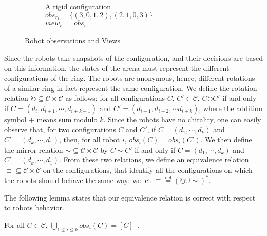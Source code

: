 \documentclass[envcountsame]{llncs} \usepackage[english]{babel}
\newcommand{\view}{\ensuremath{\mathit{view}}}
\newcommand{\obs}{\ensuremath{\mathit{obs}}}
\newcommand{\equivclass}[1]{[#1]_\equiv}
\newcommand{\Config}{\ensuremath{\mathcal{C}}}
\begin{document}
\begin{figure}[t]
\begin{subfigure}[b]{0.30\textwidth}
\caption{A rigid configuration \\${\scriptstyle obs_{r_1}=\{(3,0,1,2),(2,1,0,3)\}}$\\ ${\scriptstyle \view_{r_1} = obs_{r_1}}$}
\label{fig:views3}
  \end{subfigure}
  \caption{Robot observations and Views}
  \label{fig:views}
\end{figure}






Since the robots take snapshots of the configuration, and their decisions are based on this information,
the states of the arena must represent the different configurations of the ring.
The robots are anonymous, hence, different rotations of a similar ring in fact represent the same configuration.
We define the rotation relation $\circlearrowright \subseteq \Config\times \Config$ as follows: for all configurations $C$, $C'\in \Config$,
$C\circlearrowright C'$ if and only if $C=(d_i,d_{i+1}, \cdots, d_{i+k-1})$ and $C'=(d_{i+1}, d_{i+2}, \cdots d_{i+k})$, where the addition symbol $+$
means sum modulo $k$.
Since the robots have no chirality, one can easily observe that, for two configurations $C$ and $C'$, if $C=(d_1,\cdots, d_k)$ and
$C'=(d_k, \cdots, d_1)$, then, for all robot $i$, $\obs_i(C)=\obs_i(C')$. We then define the mirror relation $\sim\subseteq \Config\times\Config$
by $C\sim C'$ if and only if $C=(d_1,\cdots, d_k)$ and
$C'=(d_k, \cdots, d_1)$.
From these two relations, we define an equivalence relation ${\equiv}\subseteq \Config\times\Config$ on the configurations, that identify all the configurations
on which the robots should behave the same way: we let ${\equiv} \stackrel{\mathrm{def}}{=} {(\circlearrowright\cup \sim)^*}$.

The following lemma states that our equivalence relation is correct with respect to robots behavior.
\begin{lemma}\label{lem:equivalence-classes}
For all $C\in \Config$, $\bigcup_{1\leq i\leq k} \obs_i(C) = \equivclass{C}$.
\end{lemma}
\end{document}
